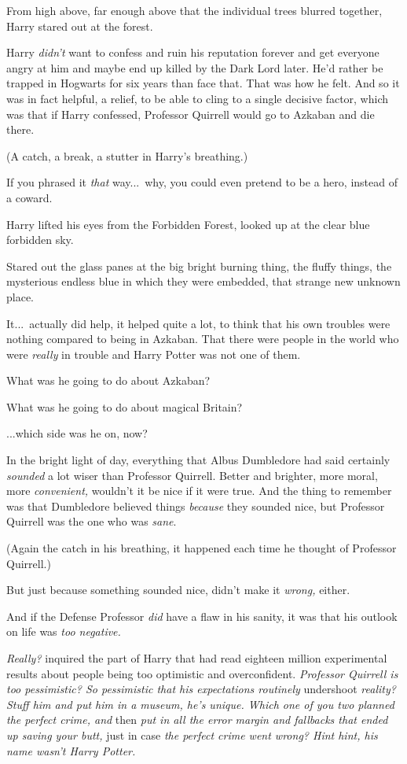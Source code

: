 From high above, far enough above that the individual trees blurred together, Harry stared out at the forest.

Harry \emph{didn’t} want to confess and ruin his reputation forever and get everyone angry at him and maybe end up killed by the Dark Lord later. He’d rather be trapped in Hogwarts for six years than face that. That was how he felt. And so it was in fact helpful, a relief, to be able to cling to a single decisive factor, which was that if Harry confessed, Professor Quirrell would go to Azkaban and die there.

(A catch, a break, a stutter in Harry’s breathing.)

If you phrased it \emph{that} way...\ why, you could even pretend to be a hero, instead of a coward.

Harry lifted his eyes from the Forbidden Forest, looked up at the clear blue forbidden sky.

Stared out the glass panes at the big bright burning thing, the fluffy things, the mysterious endless blue in which they were embedded, that strange new unknown place.

It...\ actually did help, it helped quite a lot, to think that his own troubles were nothing compared to being in Azkaban. That there were people in the world who were \emph{really} in trouble and Harry Potter was not one of them.

What was he going to do about Azkaban?

What was he going to do about magical Britain?

...which side was he on, now?

In the bright light of day, everything that Albus Dumbledore had said certainly \emph{sounded} a lot wiser than Professor Quirrell. Better and brighter, more moral, more \emph{convenient,} wouldn’t it be nice if it were true. And the thing to remember was that Dumbledore believed things \emph{because} they sounded nice, but Professor Quirrell was the one who was \emph{sane}.

(Again the catch in his breathing, it happened each time he thought of Professor Quirrell.)

But just because something sounded nice, didn’t make it \emph{wrong,} either.

And if the Defense Professor \emph{did} have a flaw in his sanity, it was that his outlook on life was \emph{too negative.}

\emph{Really?} inquired the part of Harry that had read eighteen million experimental results about people being too optimistic and overconfident. \emph{Professor Quirrell is too pessimistic? So pessimistic that his expectations routinely} undershoot \emph{reality? Stuff him and put him in a museum, he’s unique. Which one of you two planned the perfect crime, and} then \emph{put in all the error margin and fallbacks that ended up saving your butt,} just in case \emph{the perfect crime went wrong? Hint hint, his name wasn’t Harry Potter.}

